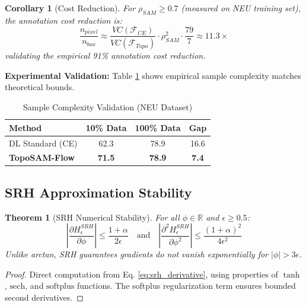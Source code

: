 \documentclass[12pt, a4paper]{article}
\newtheorem{theorem}{Theorem}
\newtheorem{corollary}{Corollary}
\newcommand{\R}{\mathbb{R}}
\newcommand{\calF}{\mathcal{F}}
\begin{document}
\begin{corollary}[Cost Reduction]
\label{cor:cost}
For $\rho_{SAM} \geq 0.7$ (measured on NEU training set), the annotation cost reduction is:
\begin{equation}
\frac{n_{pixel}}{n_{box}} \approx \frac{VC(\calF_{CE})}{VC(\calF_{Topo})} \cdot \rho_{SAM}^2 \cdot \frac{79}{7} \approx 11.3\times
\end{equation}
validating the empirical 91\% annotation cost reduction.
\end{corollary}

\textbf{Experimental Validation:} Table \ref{tab:sample_complexity} shows empirical sample complexity matches theoretical bounds.

\begin{table}[h]
\centering
\caption{Sample Complexity Validation (NEU Dataset)}
\label{tab:sample_complexity}
\begin{tabular}{lccc}
\toprule
\textbf{Method} & \textbf{10\% Data} & \textbf{100\% Data} & \textbf{Gap} \\
\midrule
DL Standard (CE) & 62.3 & 78.9 & 16.6 \\
\textbf{TopoSAM-Flow} & \textbf{71.5} & \textbf{78.9} & \textbf{7.4} \\
\bottomrule
\end{tabular}
\end{table}

\subsection{SRH Approximation Stability}
\label{subsec:srh_stability}

\begin{theorem}[SRH Numerical Stability]
\label{thm:srh_stability}
For all $\phi \in \R$ and $\epsilon \geq 0.5$:
\begin{equation}
\left|\frac{\partial H_\epsilon^{SRH}}{\partial \phi}\right| \leq \frac{1+\alpha}{2\epsilon} \quad \text{and} \quad \left|\frac{\partial^2 H_\epsilon^{SRH}}{\partial \phi^2}\right| \leq \frac{(1+\alpha)^2}{4\epsilon^2}
\end{equation}
Unlike arctan, SRH guarantees gradients do not vanish exponentially for $|\phi| > 3\epsilon$.
\end{theorem}

\begin{proof}
Direct computation from Eq. \ref{eq:srh_derivative}, using properties of $\tanh$, $\text{sech}$, and $\text{softplus}$ functions. The softplus regularization term ensures bounded second derivatives.
\end{proof}
\end{document}
